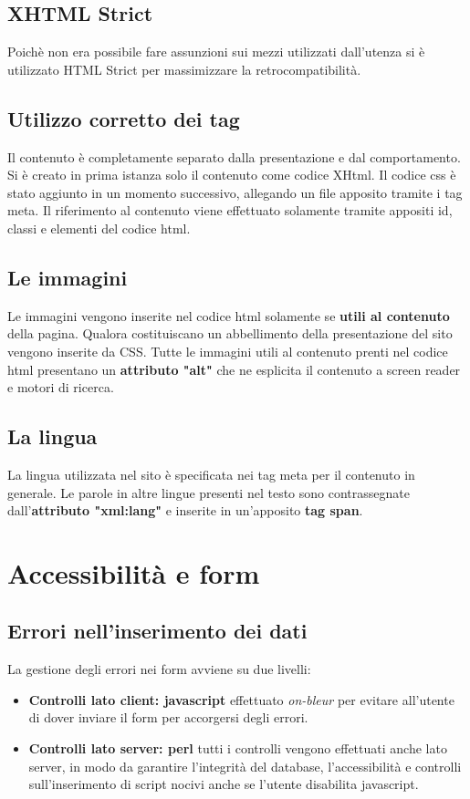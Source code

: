 \documentclass[12pt,a4paper]{article}
\begin{document}
\subsection{XHTML Strict}
Poichè non era possibile fare assunzioni sui mezzi utilizzati dall'utenza si è utilizzato HTML Strict per massimizzare la retrocompatibilità. 

\subsection{Utilizzo corretto dei tag}
Il contenuto è completamente separato dalla presentazione e dal comportamento. 
Si è creato in prima istanza solo il contenuto come codice XHtml. Il codice css è stato aggiunto in un momento successivo, allegando un file apposito tramite i tag meta. 
Il riferimento al contenuto viene effettuato solamente tramite appositi id, classi e elementi del codice html. 
 
\subsection{Le immagini}
Le immagini vengono inserite nel codice html solamente se \textbf{utili al contenuto} della pagina. 
Qualora costituiscano un abbellimento della presentazione del sito vengono inserite da CSS. 
Tutte le immagini utili al contenuto prenti nel codice html presentano un \textbf{attributo "alt"} che ne esplicita il contenuto a screen reader e motori di ricerca. 

\subsection{La lingua} La lingua utilizzata nel sito è specificata nei tag meta per il contenuto in generale. 
Le parole in altre lingue presenti nel testo sono contrassegnate dall'\textbf{attributo "xml:lang"}  e inserite in un'apposito \textbf{tag span}.

\section{Accessibilità e form}
\subsection{Errori nell'inserimento dei dati}
La gestione degli errori nei form avviene su due livelli:
\begin{itemize}
	\item \textbf{Controlli lato client: javascript} effettuato \textit{on-bleur} per evitare all'utente di dover inviare il form per accorgersi degli errori.
	\item \textbf{Controlli lato server: perl} tutti i controlli vengono effettuati anche lato server, in modo da garantire l'integrità del database, l'accessibilità e controlli sull'inserimento di script nocivi anche se l'utente disabilita javascript.
\end{itemize}
\end{document}
